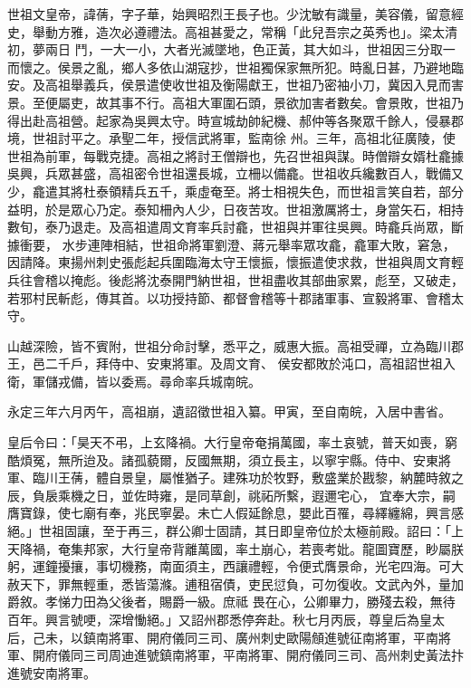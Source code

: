 
\begin{pinyinscope}

 世祖文皇帝，諱蒨，字子華，始興昭烈王長子也。少沈敏有識量，美容儀，留意經史，舉動方雅，造次必遵禮法。高祖甚愛之，常稱「此兒吾宗之英秀也」。梁太清初，夢兩日
 鬥，一大一小，大者光滅墜地，色正黃，其大如斗，世祖因三分取一而懷之。侯景之亂，鄉人多依山湖寇抄，世祖獨保家無所犯。時亂日甚，乃避地臨安。及高祖舉義兵，侯景遣使收世祖及衡陽獻王，世祖乃密袖小刀，冀因入見而害景。至便屬吏，故其事不行。高祖大軍圍石頭，景欲加害者數矣。會景敗，世祖乃得出赴高祖營。起家為吳興太守。時宣城劫帥紀機、郝仲等各聚眾千餘人，侵暴郡境，世祖討平之。承聖二年，授信武將軍，監南徐
 州。三年，高祖北征廣陵，使世祖為前軍，每戰克捷。高祖之將討王僧辯也，先召世祖與謀。時僧辯女婿杜龕據吳興，兵眾甚盛，高祖密令世祖還長城，立柵以備龕。世祖收兵纔數百人，戰備又少，龕遣其將杜泰領精兵五千，乘虛奄至。將士相視失色，而世祖言笑自若，部分益明，於是眾心乃定。泰知柵內人少，日夜苦攻。世祖激厲將士，身當矢石，相持數旬，泰乃退走。及高祖遣周文育率兵討龕，世祖與并軍往吳興。時龕兵尚眾，斷據衝要，
 水步連陣相結，世祖命將軍劉澄、蔣元舉率眾攻龕，龕軍大敗，窘急，因請降。東揚州刺史張彪起兵圍臨海太守王懷振，懷振遣使求救，世祖與周文育輕兵往會稽以掩彪。後彪將沈泰開門納世祖，世祖盡收其部曲家累，彪至，又破走，若邪村民斬彪，傳其首。以功授持節、都督會稽等十郡諸軍事、宣毅將軍、會稽太守。



 山越深險，皆不賓附，世祖分命討擊，悉平之，威惠大振。高祖受禪，立為臨川郡王，邑二千戶，拜侍中、安東將軍。及周文育、
 侯安都敗於沌口，高祖詔世祖入衛，軍儲戎備，皆以委焉。尋命率兵城南皖。



 永定三年六月丙午，高祖崩，遺詔徵世祖入纂。甲寅，至自南皖，入居中書省。



 皇后令曰：「昊天不弔，上玄降禍。大行皇帝奄捐萬國，率土哀號，普天如喪，窮酷煩冤，無所迨及。諸孤藐爾，反國無期，須立長主，以寧宇縣。侍中、安東將軍、臨川王蒨，體自景皇，屬惟猶子。建殊功於牧野，敷盛業於戡黎，納麓時敘之辰，負扆乘機之日，並佐時雍，是同草創，祧祏所繫，遐邇宅心，
 宜奉大宗，嗣膺寶錄，使七廟有奉，兆民寧晏。未亡人假延餘息，嬰此百罹，尋繹纏綿，興言感絕。」世祖固讓，至于再三，群公卿士固請，其日即皇帝位於太極前殿。詔曰：「上天降禍，奄集邦家，大行皇帝背離萬國，率土崩心，若喪考妣。龍圖寶歷，眇屬朕躬，運鐘擾攘，事切機務，南面須主，西讓禮輕，令便式膺景命，光宅四海。可大赦天下，罪無輕重，悉皆蕩滌。逋租宿債，吏民愆負，可勿復收。文武內外，量加爵敘。孝悌力田為父後者，賜爵一級。庶祗
 畏在心，公卿畢力，勝殘去殺，無待百年。興言號哽，深增慟絕。」又詔州郡悉停奔赴。秋七月丙辰，尊皇后為皇太后，己未，以鎮南將軍、開府儀同三司、廣州刺史歐陽頠進號征南將軍，平南將軍、開府儀同三司周迪進號鎮南將軍，平南將軍、開府儀同三司、高州刺史黃法抃進號安南將軍。




\end{pinyinscope}
